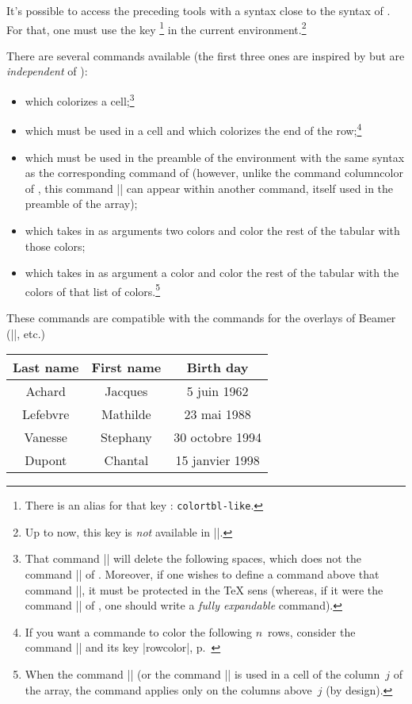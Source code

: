 \documentclass[dvipsnames]{article}%
\begin{document}
It's possible to access the preceding tools with a syntax close to the syntax
of . For that, one must use the key \footnote{There
  is an alias for that key : \texttt{colortbl-like}.} in the
current environment.\footnote{Up to now, this key is \emph{not} available in |\NiceMatrixOptions|.}

There are several commands available (the first three ones are inspired by
 but are \emph{independent} of ):
\begin{itemize}
\item {} which colorizes a cell;\footnote{That
  command |\cellcolor| will delete the following spaces, which does not the
  command |\cellcolor| of . Moreover, if one wishes to define a
  command above that command |\cellcolor|, it must be protected in the TeX sens
  (whereas, if it were the command |\cellcolor| of , one should
  write a \emph{fully expandable} command).}
\item {} which must be used in a cell and which
colorizes the end of the row;\footnote{If you want a commande to color the
  following $n$~rows, consider the command |\RowStyle| and its key |rowcolor|,
  p.~\pageref{RowStyle}} 
\item {} which must be used in the preamble of the
environment with the same syntax as the corresponding command of 
(however, unlike the command columncolor of , this command
|\columncolor| can appear within another command, itself used in the preamble of
the array);
\item {} which takes in as arguments two colors and
color the rest of the tabular with those colors;
\item {} which takes in as argument a color and
color the rest of the tabular with the colors of that list of
colors.\footnote{When the command |\rowlistcolors| (or the command |\rowcolors|
  is used in a cell of the column~$j$ of the array, the command applies only on
  the columns above~$j$ (by design).}
\end{itemize}
These commands are compatible with the commands for the overlays of Beamer
(|\only|, etc.) 

\smallskip
\begin{Code}
\NewDocumentCommand { \Blue } { } { \emph{} }
\begin{NiceTabular}{>{\Blue}c>{\Blue}cc} 
\toprule
\emph{}
Last name & First name & Birth day \\
\midrule
Achard  & Jacques & 5 juin 1962 \\
Lefebvre & Mathilde & 23 mai 1988 \\
Vanesse & Stephany & 30 octobre 1994 \\
Dupont & Chantal & 15 janvier 1998 \\
\bottomrule
\end{NiceTabular}
\end{Code}
\end{document}
